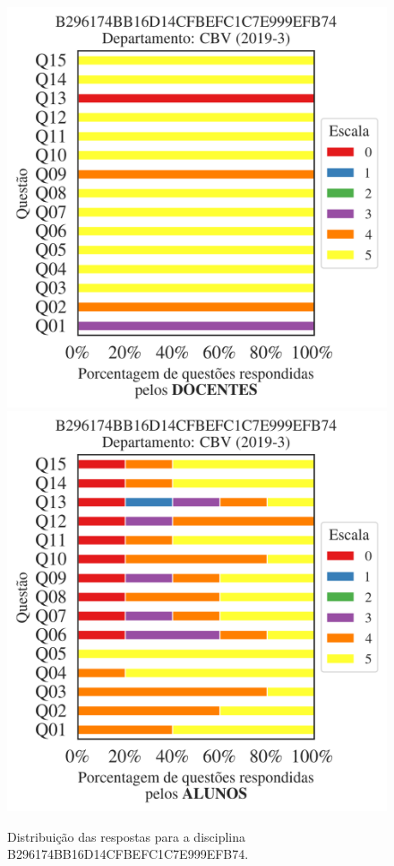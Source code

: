 \documentclass[a4paper,10pt]{article}
\begin{document}
\begin{figure}[h]
\centering
\includegraphics[width=0.485\linewidth]{analise_disciplina_departamento_CBV_B296174BB16D14CFBEFC1C7E999EFB74_docentes.png}
\includegraphics[width=0.485\linewidth]{analise_disciplina_departamento_CBV_B296174BB16D14CFBEFC1C7E999EFB74_alunos.png}
\caption{\label{fig:analise_geral_departamento}                Distribuição das respostas para a disciplina B296174BB16D14CFBEFC1C7E999EFB74. }
\end{figure}
\end{document}
